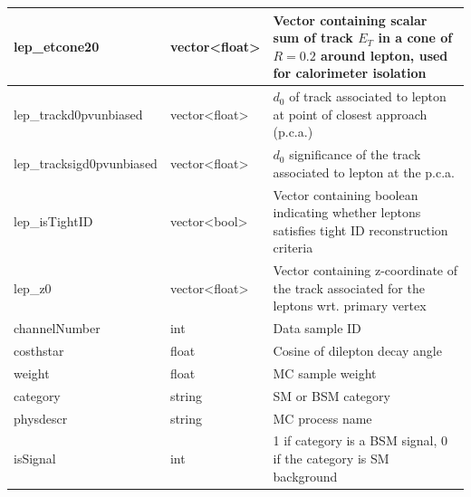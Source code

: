 \documentclass[ reprint, amsmath,amssymb, aps, nofootinbib]{revtex4-2}
\begin{document}
\begin{table}[H]
\begin{center}
\begin{tabular}{|C{4.5cm}|C{4.5cm}|L{9.5cm}|}
    lep\_etcone20 & vector<float>  & Vector containing scalar sum of track $E_T$ in a cone of $R=0.2$ around lepton, used for calorimeter isolation \\ \hline
    lep\_trackd0pvunbiased  & vector<float> & $d_0$ of track associated to lepton at point of closest approach (p.c.a.)\\ \hline
    lep\_tracksigd0pvunbiased & vector<float> & $d_0$ significance of the track associated to lepton at the p.c.a.\\ \hline
    lep\_isTightID & vector<bool> & Vector containing boolean indicating whether leptons satisfies tight ID reconstruction criteria\\ \hline
    lep\_z0 & vector<float> & Vector containing z-coordinate of the track associated for the leptons wrt. primary vertex \\ \hline
    
    channelNumber & int & Data sample ID\\\hline
    costhstar & float & Cosine of dilepton decay angle\\ \hline
    weight & float & MC sample weight \\ \hline
    category & string & SM or BSM category \\ \hline
    physdescr & string & MC process name \\ \hline
    isSignal & int & 1 if category is a BSM signal, 0 if the category is SM background \\ \hline
            
    \end{tabular}
    \label{tab:feature_table}
  \end{center}
\end{table}
\end{document}
